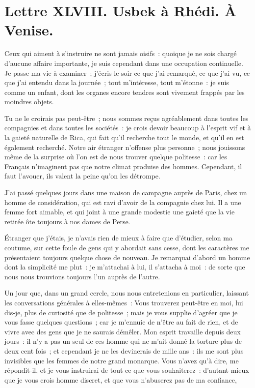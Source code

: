 \documentclass[french,twoside]{book} %
\newcommand{\dateline}[1]{\medskip{\RaggedLeft{#1}\par}\bigskip}
\begin{document}
\dateline{Du sérail de Fatmé, le 2 de la lune de Rhamazan, 1713.}
\section[{Lettre XLVIII. Usbek à Rhédi. À Venise.}]{Lettre XLVIII. Usbek à Rhédi. À Venise.}\renewcommand{\leftmark}{Lettre XLVIII. Usbek à Rhédi. À Venise.}

\noindent Ceux qui aiment à s’instruire ne sont jamais oisifs : quoique je ne sois chargé d’aucune affaire importante, je suis cependant dans une occupation continuelle. Je passe ma vie à examiner ; j’écris le soir ce que j’ai remarqué, ce que j’ai vu, ce que j’ai entendu dans la journée ; tout m’intéresse, tout m’étonne : je suis comme un enfant, dont les organes encore tendres sont vivement frappés par les moindres objets.\par
Tu ne le croirais pas peut-être ; nous sommes reçus agréablement dans toutes les compagnies et dans toutes les sociétés : je crois devoir beaucoup à l’esprit vif et à la gaieté naturelle de Rica, qui fait qu’il recherche tout le monde, et qu’il en est également recherché. Notre air étranger n’offense plus personne ; nous jouissons même de la surprise où l’on est de nous trouver quelque politesse : car les Français n’imaginent pas que notre climat produise des hommes. Cependant, il faut l’avouer, ils valent la peine qu’on les détrompe.\par
J’ai passé quelques jours dans une maison de campagne auprès de Paris, chez un homme de considération, qui est ravi d’avoir de la compagnie chez lui. Il a une femme fort aimable, et qui joint à une grande modestie une gaieté que la vie retirée ôte toujours à nos dames de Perse.\par
Étranger que j’étais, je n’avais rien de mieux à faire que d’étudier, selon ma coutume, sur cette foule de gens qui y abordait sans cesse, dont les caractères me présentaient toujours quelque chose de nouveau. Je remarquai d’abord un homme dont la simplicité me plut : je m’attachai à lui, il s’attacha à moi : de sorte que nous nous trouvions toujours l’un auprès de l’autre.\par
Un jour que, dans un grand cercle, nous nous entretenions en particulier, laissant les conversations générales à elles-mêmes : Vous trouverez peut-être en moi, lui dis-je, plus de curiosité que de politesse ; mais je vous supplie d’agréer que je vous fasse quelques questions ; car je m’ennuie de n’être au fait de rien, et de vivre avec des gens que je ne saurais démêler. Mon esprit travaille depuis deux jours : il n’y a pas un seul de ces homme qui ne m’ait donné la torture plus de deux cent fois ; et cependant je ne les devinerais de mille ans : ils me sont plus invisibles que les femmes de notre grand monarque. Vous n’avez qu’à dire, me répondit-il, et je vous instruirai de tout ce que vous souhaiterez : d’autant mieux que je vous crois homme discret, et que vous n’abuserez pas de ma confiance,\par
\end{document}
